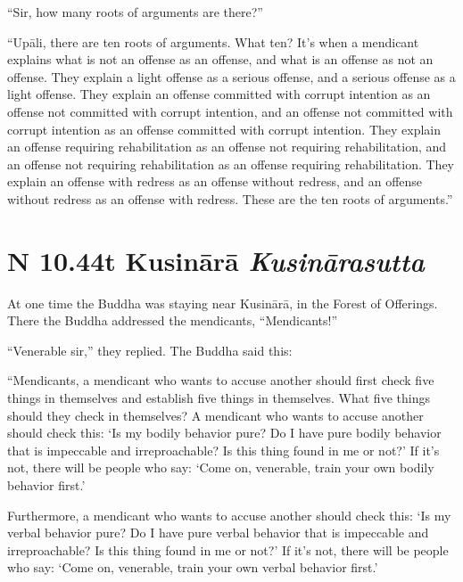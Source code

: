 \documentclass[12pt,openany]{book}%
\newcommand*{\suttatitleacronym}[1]{\smaller[2]{#1}\vspace*{.3em}}
\newcommand*{\suttatitletranslation}[1]{\linebreak{#1}}
\newcommand*{\suttatitleroot}[1]{\linebreak\smaller[2]\itshape{#1}}
\newcommand*{\tocacronym}[1]{\hspace*{-3.3em}{#1}\quad}
\newcommand*{\toctranslation}[1]{#1}
\newcommand*{\tocroot}[1]{(\textit{#1})}
\begin{document}
“Sir, how many roots of arguments are there?” 

“\textsanskrit{Upāli}, there are ten roots of arguments. What ten? It’s when a mendicant explains what is not an offense as an offense, and what is an offense as not an offense. They explain a light offense as a serious offense, and a serious offense as a light offense. They explain an offense committed with corrupt intention as an offense not committed with corrupt intention, and an offense not committed with corrupt intention as an offense committed with corrupt intention. They explain an offense requiring rehabilitation as an offense not requiring rehabilitation, and an offense not requiring rehabilitation as an offense requiring rehabilitation. They explain an offense with redress as an offense without redress, and an offense without redress as an offense with redress. These are the ten roots of arguments.” 

%
\section*{{\suttatitleacronym AN 10.44}{\suttatitletranslation At Kusinārā }{\suttatitleroot Kusinārasutta}}
\addcontentsline{toc}{section}{\tocacronym{AN 10.44} \toctranslation{At Kusinārā } \tocroot{Kusinārasutta}}

At one time the Buddha was staying near \textsanskrit{Kusinārā}, in the Forest of Offerings. There the Buddha addressed the mendicants, “Mendicants!” 

“Venerable sir,” they replied. The Buddha said this: 

“Mendicants, a mendicant who wants to accuse another should first check five things in themselves and establish five things in themselves. What five things should they check in themselves? A mendicant who wants to accuse another should check this: ‘Is my bodily behavior pure? Do I have pure bodily behavior that is impeccable and irreproachable? Is this thing found in me or not?’ If it’s not, there will be people who say: ‘Come on, venerable, train your own bodily behavior first.’ 

Furthermore, a mendicant who wants to accuse another should check this: ‘Is my verbal behavior pure? Do I have pure verbal behavior that is impeccable and irreproachable? Is this thing found in me or not?’ If it’s not, there will be people who say: ‘Come on, venerable, train your own verbal behavior first.’ 
\end{document}
